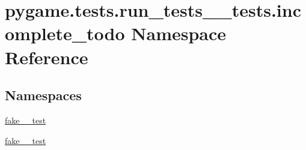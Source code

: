 \hypertarget{namespacepygame_1_1tests_1_1run__tests____tests_1_1incomplete__todo}{}\section{pygame.\+tests.\+run\+\_\+tests\+\_\+\+\_\+tests.\+incomplete\+\_\+todo Namespace Reference}
\label{namespacepygame_1_1tests_1_1run__tests____tests_1_1incomplete__todo}
\subsection*{Namespaces}
\begin{DoxyCompactItemize}
\item 
 \hyperlink{namespacepygame_1_1tests_1_1run__tests____tests_1_1incomplete__todo_1_1fake__2__test}{fake\+\_\+\_\+test}
\item 
 \hyperlink{namespacepygame_1_1tests_1_1run__tests____tests_1_1incomplete__todo_1_1fake__3__test}{fake\+\_\+\_\+test}
\end{DoxyCompactItemize}

